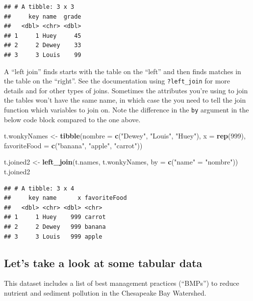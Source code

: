 \documentclass[
]{article}
\newenvironment{Shaded}{\begin{snugshade}}{\end{snugshade}}
\newcommand{\AttributeTok}[1]{\textcolor[rgb]{0.13,0.29,0.53}{#1}}
\newcommand{\DecValTok}[1]{\textcolor[rgb]{0.00,0.00,0.81}{#1}}
\newcommand{\FunctionTok}[1]{\textcolor[rgb]{0.13,0.29,0.53}{\textbf{#1}}}
\newcommand{\NormalTok}[1]{#1}
\newcommand{\OtherTok}[1]{\textcolor[rgb]{0.56,0.35,0.01}{#1}}
\newcommand{\StringTok}[1]{\textcolor[rgb]{0.31,0.60,0.02}{#1}}
\begin{document}
\begin{verbatim}
## # A tibble: 3 x 3
##     key name  grade
##   <dbl> <chr> <dbl>
## 1     1 Huey     45
## 2     2 Dewey    33
## 3     3 Louis    99
\end{verbatim}

A ``left join'' finds starts with the table on the ``left'' and then
finds matches in the table on the ``right''. See the documentation using
\texttt{?left\_join} for more details and for other types of joins.
Sometimes the attributes you're using to join the tables won't have the
same name, in which case the you need to tell the join function which
variables to join on. Note the difference in the \texttt{by} argument in
the below code block compared to the one above.

\begin{Shaded}
\begin{Highlighting}[]
\NormalTok{t.wonkyNames }\OtherTok{\textless{}{-}} \FunctionTok{tibble}\NormalTok{(}\AttributeTok{nombre =} \FunctionTok{c}\NormalTok{(}\StringTok{"Dewey"}\NormalTok{, }\StringTok{"Louis"}\NormalTok{, }\StringTok{"Huey"}\NormalTok{),}
                       \AttributeTok{x =} \FunctionTok{rep}\NormalTok{(}\DecValTok{999}\NormalTok{),}
                       \AttributeTok{favoriteFood =} \FunctionTok{c}\NormalTok{(}\StringTok{"banana"}\NormalTok{, }\StringTok{"apple"}\NormalTok{, }\StringTok{"carrot"}\NormalTok{))}

\NormalTok{t.joined2 }\OtherTok{\textless{}{-}} \FunctionTok{left\_join}\NormalTok{(t.names, t.wonkyNames, }\AttributeTok{by =} \FunctionTok{c}\NormalTok{(}\StringTok{"name"} \OtherTok{=} \StringTok{"nombre"}\NormalTok{))}
\NormalTok{t.joined2}
\end{Highlighting}
\end{Shaded}

\begin{verbatim}
## # A tibble: 3 x 4
##     key name      x favoriteFood
##   <dbl> <chr> <dbl> <chr>       
## 1     1 Huey    999 carrot      
## 2     2 Dewey   999 banana      
## 3     3 Louis   999 apple
\end{verbatim}

\subsection{Let's take a look at some tabular
data}\label{lets-take-a-look-at-some-tabular-data}

This dataset includes a list of best management practices (``BMPs'') to
reduce nutrient and sediment pollution in the Chesapeake Bay Watershed.
\end{document}
